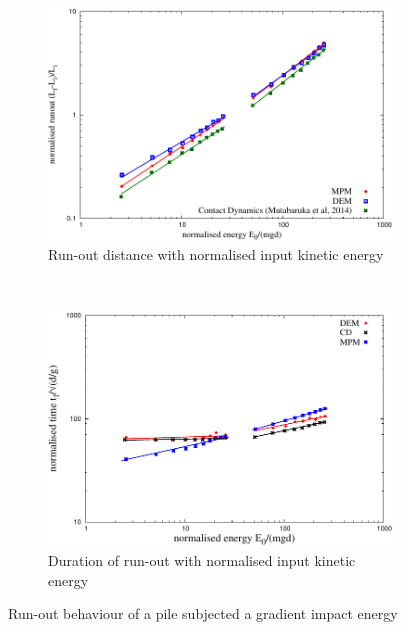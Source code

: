 \begin{figure}[tbph]
\centering
\begin{subfigure}[b]{0.975\textwidth}
\centering
\includegraphics[width=\textwidth]{Runout_Eo_MPM_CD_DEM}
\caption{Run-out distance with normalised input kinetic energy}
\label{fig:Runout_Eo_MPM_CD_DEM}
\end{subfigure}
\\
\begin{subfigure}[b]{0.975\textwidth}
\centering
\includegraphics[width=\textwidth]{Tf_vs_Eo_Slope}
\caption{Duration of run-out with normalised input kinetic energy}
\label{fig:Tf_vs_Eo_Slope}
\end{subfigure}
\caption{Run-out behaviour of a pile subjected a gradient impact energy}
\label{fig:Slope}
\end{figure}

